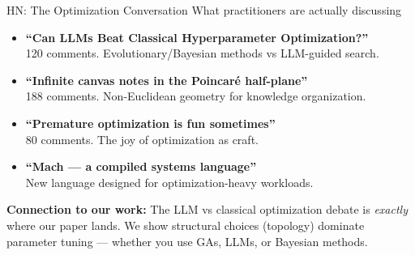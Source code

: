 \documentclass[aspectratio=169,14pt]{beamer}
\newcommand{\bscore}[1]{{\color{geccoAccent}\bfseries #1}}
\newcommand{\connection}[1]{%
  \vspace{4pt}
  {\small\color{geccoHighlight}\textbf{Connection to our work:} \color{white}#1}}
\begin{document}
\begin{frame}{HN: The Optimization Conversation}
  {\small\color{dimGray} What practitioners are actually discussing}
  \vspace{8pt}

  \begin{itemize}
    \item[\bscore{35.5}] \textbf{``Can LLMs Beat Classical Hyperparameter Optimization?''}\\
      {\small 120 comments. Evolutionary/Bayesian methods vs LLM-guided search.}
    \vspace{6pt}
    \item[\bscore{18.2}] \textbf{``Infinite canvas notes in the Poincar\'{e} half-plane''}\\
      {\small 188 comments. Non-Euclidean geometry for knowledge organization.}
    \vspace{6pt}
    \item[\bscore{17.4}] {\color{geccoHighlight}\textbf{``Premature optimization is fun sometimes''}}\\
      {\small 80 comments. The joy of optimization as craft.}
    \vspace{6pt}
    \item[\bscore{7.9}] \textbf{``Mach --- a compiled systems language''}\\
      {\small New language designed for optimization-heavy workloads.}
  \end{itemize}

  \vspace{6pt}
  \connection{The LLM vs classical optimization debate is \emph{exactly} where our paper lands. We show structural choices (topology) dominate parameter tuning --- whether you use GAs, LLMs, or Bayesian methods.}
\end{frame}
\end{document}

